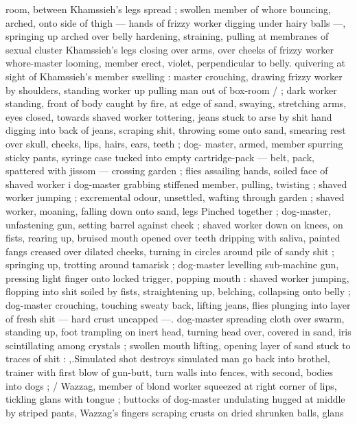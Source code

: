 room, between Khamssieh's legs spread ; swollen member of whore 
bouncing, arched, onto side of thigh --- hands of frizzy worker 
digging under hairy balls ---, springing up arched over belly 
hardening, straining, pulling at membranes of sexual cluster 
Khamssieh's legs closing over arms, over cheeks of frizzy worker 
whore-master looming, member erect, violet, perpendicular to belly. 
quivering at sight of Khamssieh's member swelling : master 
crouching, drawing frizzy worker by shoulders, standing worker up 
pulling man out of box-room {\slash} ; dark worker standing, front of body 
caught by fire, at edge of sand, swaying, stretching arms, eyes 
closed, towards shaved worker tottering, jeans stuck to arse by shit 
hand digging into back of jeans, scraping shit, throwing some onto 
sand, smearing rest over skull, cheeks, lips, hairs, ears, teeth ; dog- 
master, armed, member spurring sticky pants, syringe case tucked 
into empty cartridge-pack --- belt, pack, spattered with jissom --- 
crossing garden ; flies assailing hands, soiled face of shaved worker 
i dog-master grabbing stiffened member, pulling, twisting ; shaved 
worker jumping ; excremental odour, unsettled, wafting through 
garden ; shaved worker, moaning, falling down onto sand, legs 
Pinched together ; dog-master, unfastening gun, setting barrel 
against cheek ; shaved worker down on knees, on fists, rearing up, 
bruised mouth opened over teeth dripping with saliva, painted fangs 
creased over dilated cheeks, turning in circles around pile of sandy 
shit ; springing up, trotting around tamarisk ; dog-master levelling 
sub-machine gun, pressing light finger onto locked trigger, popping 
mouth : shaved worker jumping, flopping into shit soiled by fists, 
straightening up, belching, collapsing onto belly ; dog-master 
crouching, touching sweaty back, lifting jeans, flies plunging into 
layer of fresh shit --- hard crust uncapped ---. dog-master spreading 
cloth over swarm, standing up, foot trampling on inert head, turning 
head over, covered in sand, iris scintillating among crystals ; swollen 
mouth lifting, opening layer of sand stuck to traces of shit : 
{\gl},{\thd}.Simulated shot destroys simulated man{\td} go back into brothel, 
trainer{\thd} with first blow of gun-butt, turn walls into fences, with 
second, bodies into dogs{\thd}{\td} {\gr} ; {\slash} Wazzag, member of blond worker 
squeezed at right corner of lips, tickling glans with tongue ; buttocks 
of dog-master undulating hugged at middle by striped pants, 
Wazzag's fingers scraping crusts on dried shrunken balls, glans 
